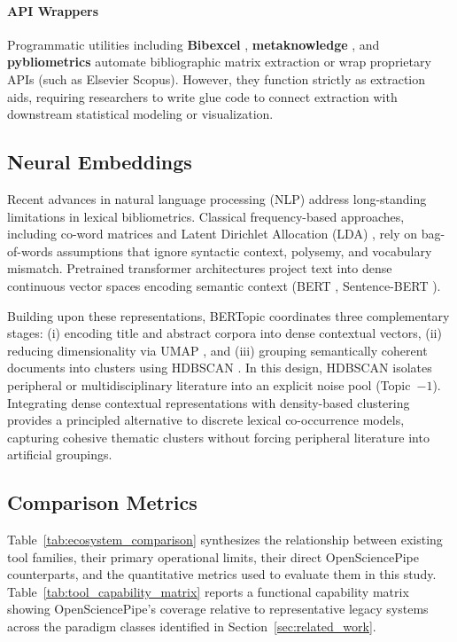 \documentclass[preprint,12pt]{elsarticle}
\begin{document}
\paragraph{API Wrappers} Programmatic utilities including \textbf{Bibexcel} \cite{persson2009bibexcel}, \textbf{metaknowledge} \cite{mclevey2017metaknowledge}, and \textbf{pybliometrics} \cite{rose2019pybliometrics} automate bibliographic matrix extraction or wrap proprietary APIs (such as Elsevier Scopus). However, they function strictly as extraction aids, requiring researchers to write glue code to connect extraction with downstream statistical modeling or visualization.

\subsection{Neural Embeddings}
Recent advances in natural language processing (NLP) address long-standing limitations in lexical bibliometrics. Classical frequency-based approaches, including co-word matrices and Latent Dirichlet Allocation (LDA) \cite{blei2003latent}, rely on bag-of-words assumptions that ignore syntactic context, polysemy, and vocabulary mismatch. Pretrained transformer architectures project text into dense continuous vector spaces encoding semantic context (BERT \cite{devlin2018bert}, Sentence-BERT \cite{reimers2019sentence}). 

Building upon these representations, BERTopic \cite{grootendorst2022bertopic} coordinates three complementary stages: (i) encoding title and abstract corpora into dense contextual vectors, (ii) reducing dimensionality via UMAP \cite{mcinnes2018umap}, and (iii) grouping semantically coherent documents into clusters using HDBSCAN \cite{campello2013density}. In this design, HDBSCAN isolates peripheral or multidisciplinary literature into an explicit noise pool (Topic~$-1$). Integrating dense contextual representations with density-based clustering provides a principled alternative to discrete lexical co-occurrence models, capturing cohesive thematic clusters without forcing peripheral literature into artificial groupings.

\subsection{Comparison Metrics}
Table~\ref{tab:ecosystem_comparison} synthesizes the relationship between existing tool families, their primary operational limits, their direct OpenSciencePipe counterparts, and the quantitative metrics used to evaluate them in this study. Table~\ref{tab:tool_capability_matrix} reports a functional capability matrix showing OpenSciencePipe's coverage relative to representative legacy systems across the paradigm classes identified in Section~\ref{sec:related_work}.
\end{document}
